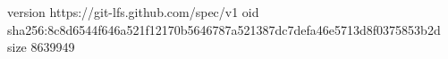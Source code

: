 version https://git-lfs.github.com/spec/v1
oid sha256:8c8d6544f646a521f12170b5646787a521387dc7defa46e5713d8f0375853b2d
size 8639949
